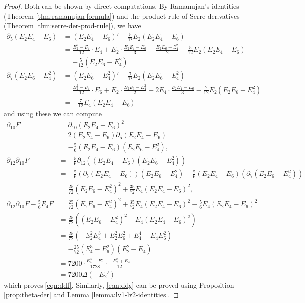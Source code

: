 \begin{proof}\leanok
Both can be shown by direct computations.
By Ramanujan's identities (Theorem \ref{thm:ramanujan-formula}) and the product rule of Serre derivatives (Theorem \ref{thm:serre-der-prod-rule}), we have
\begin{align}
    \partial_{5} (E_2 E_4 - E_6) &= (E_2 E_4 - E_6)' - \frac{5}{12} E_2 (E_2 E_4 - E_6) \\
    &= \frac{E_2^2 - E_4}{12} \cdot E_4 + E_2 \cdot \frac{E_2 E_4 - E_6}{3} - \frac{E_2 E_6 - E_4^2}{2} - \frac{5}{12}E_2 (E_2 E_4 - E_6) \\
    &= -\frac{5}{12} (E_2 E_6 - E_4^2) \label{eqn:S5} \\
    \partial_{7} (E_2 E_6 - E_4^2) &= (E_2 E_6 - E_4^2)' - \frac{7}{12} E_2 (E_2 E_6 - E_4^2) \\
    &= \frac{E_2^2 - E_4}{12} \cdot E_6 + E_2 \cdot \frac{E_2 E_6 - E_4^2}{2} - 2 E_4 \cdot \frac{E_2 E_4 - E_6}{3} - \frac{7}{12} E_2 (E_2 E_6 - E_4^2) \\
    &= -\frac{7}{12} E_4 (E_2 E_4 - E_6) \label{eqn:S7}
\end{align}
and using these we can compute
\begin{align}
    \partial_{10} F &= \partial_{10} (E_2 E_4 - E_6)^2 \\
    &= 2 (E_2 E_4 - E_6) \partial_{5} (E_2 E_4 - E_6) \\
    &= -\frac{5}{6} (E_2 E_4 - E_6) (E_2 E_6 - E_4^2), \\
    \partial_{12}\partial_{10} F &= -\frac{5}{6} \partial_{12} ((E_2 E_4 - E_6) (E_2 E_6 - E_4^2)) \\
    &= -\frac{5}{6} (\partial_{5}(E_2 E_4 - E_6)) (E_2 E_6 - E_4^2) - \frac{5}{6} (E_2 E_4 - E_6) (\partial_{7} (E_2 E_6 - E_4^2)) \\
    &= \frac{25}{72} (E_2 E_6 - E_4^2)^2 + \frac{35}{72} E_4 (E_2 E_4 - E_6)^2, \\
    \partial_{12}\partial_{10}F - \frac{5}{6} E_4 F &= \frac{25}{72}(E_2 E_6 - E_4^2)^2 + \frac{35}{72} E_4 (E_2 E_4 - E_6)^2 - \frac{5}{6} E_4 (E_2 E_4 - E_6)^2 \\
    &= \frac{25}{72} ((E_2 E_6 - E_4^2)^2 - E_4 (E_2 E_4 - E_6)^2) \\
    &= \frac{25}{72} (- E_2^2 E_4^3 + E_2^2 E_6^2 + E_4^4 - E_4 E_6^2) \\
    &= -\frac{25}{72} (E_4^3 - E_6^2) (E_2^2 - E_4) \\
    &= 7200 \cdot \frac{E_4^3 - E_6^2}{1728} \cdot \frac{-E_2^2 + E_4}{12}\\
    &= 7200 \Delta (-E_2')
\end{align}
which proves \eqref{eqn:ddf}.
Similarly, \eqref{eqn:ddg} can be proved using Proposition \ref{prop:theta-der} and Lemma \ref{lemma:lv1-lv2-identities}.
\end{proof}

